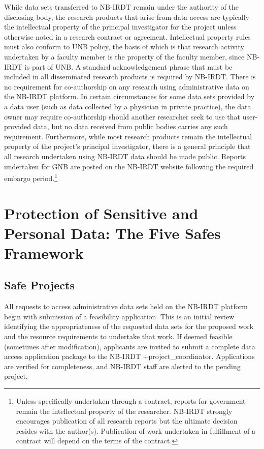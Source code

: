 \documentclass[
]{book}
\begin{document}
While data sets transferred to NB-IRDT remain under the authority of the disclosing body, the research products that arise from data access are typically the intellectual property of the principal investigator for the project unless otherwise noted in a research contract or agreement. Intellectual property rules must also conform to UNB policy, the basis of which is that research activity undertaken by a faculty member is the property of the faculty member, since NB-IRDT is part of UNB. A standard acknowledgement phrase that must be included in all disseminated research products is required by NB-IRDT. There is no requirement for co-authorship on any research using administrative data on the NB-IRDT platform. In certain circumstances for some data sets provided by a data user (such as data collected by a physician in private practice), the data owner may require co-authorship should another researcher seek to use that user-provided data, but no data received from public bodies carries any such requirement. Furthermore, while most research products remain the intellectual property of the project's principal investigator, there is a general principle that all research undertaken using NB-IRDT data should be made public. Reports undertaken for GNB are posted on the NB-IRDT website following the required embargo period.\footnote{Unless specifically undertaken through a contract, reports for government remain the intellectual property of the researcher. NB-IRDT strongly encourages publication of all research reports but the ultimate decision resides with the author(s). Publication of work undertaken in fulfillment of a contract will depend on the terms of the contract.}

\hypertarget{protection-of-sensitive-and-personal-data-the-five-safes-framework-2}{%
\section{Protection of Sensitive and Personal Data: The Five Safes Framework}\label{protection-of-sensitive-and-personal-data-the-five-safes-framework-2}}

\hypertarget{safe-projects-2}{%
\subsection{Safe Projects}\label{safe-projects-2}}

All requests to access administrative data sets held on the NB-IRDT platform begin with submission of a feasibility application. This is an initial review identifying the appropriateness of the requested data sets for the proposed work and the resource requirements to undertake that work. If deemed feasible (sometimes after modification), applicants are invited to submit a complete data access application package to the NB-IRDT +project\_coordinator\textbar. Applications are verified for completeness, and NB-IRDT staff are alerted to the pending project.
\end{document}
